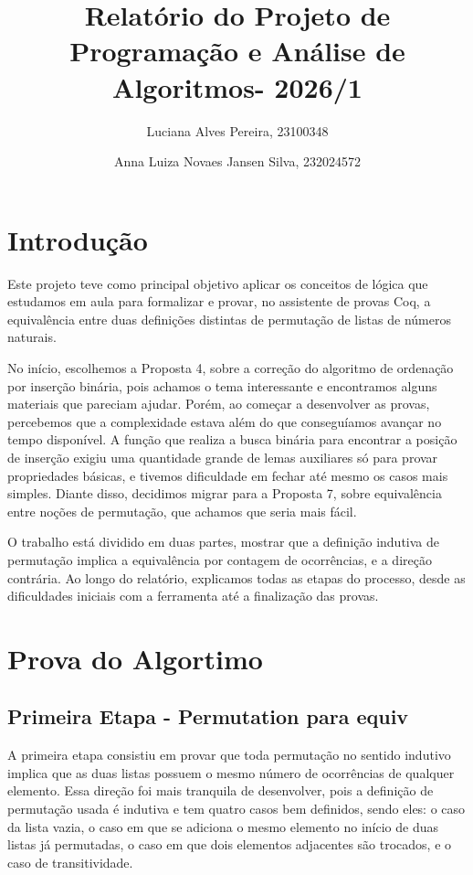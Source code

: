\documentclass[twocolumn]{article}
\title{Relatório do Projeto de Programação e Análise de Algoritmos- 2026/1}
\author{Luciana Alves Pereira, 23100348 \and Anna Luiza Novaes Jansen Silva, 232024572}
\begin{document}
\maketitle

\section{Introdução}
Este projeto teve como principal objetivo aplicar os conceitos de lógica que estudamos em aula para formalizar e provar, no assistente de provas Coq, a equivalência entre duas definições distintas de permutação de listas de números naturais.

No início, escolhemos a Proposta 4, sobre a correção do algoritmo de ordenação por inserção binária, pois achamos o tema interessante e encontramos alguns materiais que pareciam ajudar. Porém, ao começar a desenvolver as provas, percebemos que a complexidade estava além do que conseguíamos avançar no tempo disponível. A função que realiza a busca binária para encontrar a posição de inserção exigiu uma quantidade grande de lemas auxiliares só para provar propriedades básicas, e tivemos dificuldade em fechar até mesmo os casos mais simples. Diante disso, decidimos migrar para a Proposta 7, sobre equivalência entre noções de permutação, que achamos que seria mais fácil.

O trabalho está dividido em duas partes, mostrar que a definição indutiva de permutação implica a equivalência por contagem de ocorrências, e a direção contrária. Ao longo do relatório, explicamos todas as etapas do processo, desde as dificuldades iniciais com a ferramenta até a finalização das provas.

\section{Prova do Algortimo}
\subsection{Primeira Etapa - Permutation para equiv}
A primeira etapa consistiu em provar que toda permutação no sentido indutivo implica que as duas listas possuem o mesmo número de ocorrências de qualquer elemento. Essa direção foi mais tranquila de desenvolver, pois a definição de permutação usada é indutiva e tem quatro casos bem definidos, sendo eles: o caso da lista vazia, o caso em que se adiciona o mesmo elemento no início de duas listas já permutadas, o caso em que dois elementos adjacentes são trocados, e o caso de transitividade.
\end{document}
